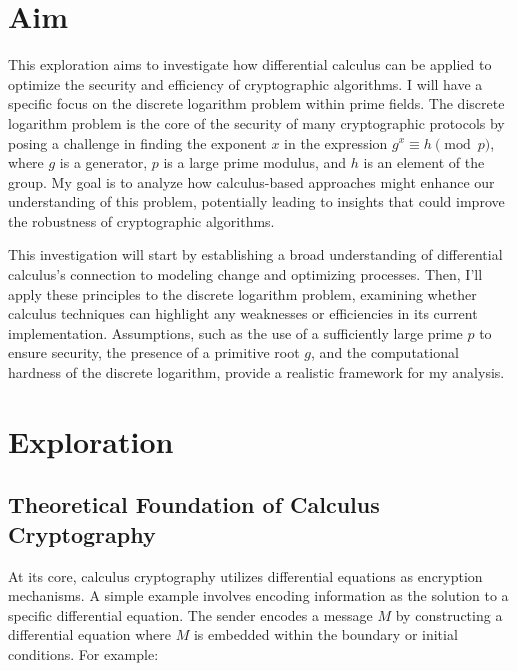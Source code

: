 \documentclass[12pt]{article}
\begin{document}
\section{Aim}
This exploration aims to investigate how differential calculus can be applied to optimize the security and efficiency of cryptographic algorithms. I will have a specific focus on the discrete logarithm problem within prime fields. The discrete logarithm problem is the core of the security of many cryptographic protocols by posing a challenge in finding the exponent \( x \) in the expression \( g^x \equiv h \pmod{p} \), where \( g \) is a generator, \( p \) is a large prime modulus, and \( h \) is an element of the group. My goal is to analyze how calculus-based approaches might enhance our understanding of this problem, potentially leading to insights that could improve the robustness of cryptographic algorithms.

This investigation will start by establishing a broad understanding of differential calculus’s connection to modeling change and optimizing processes. Then, I’ll apply these principles to the discrete logarithm problem, examining whether calculus techniques can highlight any weaknesses or efficiencies in its current implementation. Assumptions, such as the use of a sufficiently large prime \( p \) to ensure security, the presence of a primitive root \( g \), and the computational hardness of the discrete logarithm, provide a realistic framework for my analysis.













\section{Exploration}

\subsection*{Theoretical Foundation of Calculus Cryptography}

At its core, calculus cryptography utilizes differential equations as encryption mechanisms. A simple example involves encoding information as the solution to a specific differential equation. The sender encodes a message \( M \) by constructing a differential equation where \( M \) is embedded within the boundary or initial conditions. For example:
\end{document}
